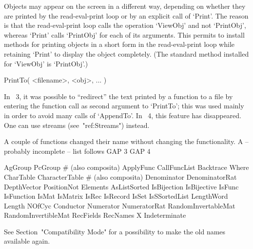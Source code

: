 Objects may appear on the screen in a different way,
depending on whether they are printed by the read-eval-print loop
or by an explicit call of `Print'.
The reason is that the read-eval-print loop calls the operation `ViewObj'
and not `PrintObj', whereas `Print' calls `PrintObj' for each of its
arguments.
This permits to  install methods for printing objects in a short form
in the read-eval-print loop while retaining `Print' to display
the object completely.
(The standard method installed for `ViewObj' is `PrintObj'.)

\>PrintTo( <filename>, <obj>, ... )

In {\GAP}~3, it was possible to ``redirect'' the text printed by a
function to a file by entering the function call as second argument
to `PrintTo';
this was used mainly in order to avoid many calls of `AppendTo'.
In {\GAP}~4, this feature has disappeared.
One can use streams (see~"ref:Streams") instead.



A couple of functions changed their name without changing the
functionality.
A -- probably incomplete -- list follows
\begintt
    GAP 3                   GAP 4

    AgGroup                 PcGroup            # (also composita)
    ApplyFunc               CallFuncList
    Backtrace               Where
    CharTable               CharacterTable     # (also composita)
    Denominator             DenominatorRat
    DepthVector             PositionNot
    Elements                AsListSorted
    IsBijection             IsBijective
    IsFunc                  IsFunction
    IsMat                   IsMatrix
    IsRec                   IsRecord
    IsSet                   IsSSortedList
    LengthWord              Length
    NOfCyc                  Conductor
    Numerator               NumeratorRat
    RandomInvertableMat     RandomInvertibleMat
    RecFields               RecNames
    X                       Indeterminate
\endtt

See Section~"Compatibility Mode" for a possibility to make the old names
available again.


